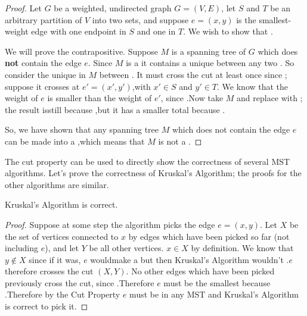 \documentclass{tufte-handout}
\begin{document}
\begin{proof}
  Let $G$ be a weighted, undirected graph $G = (V,E)$, let $S$ and $T$
  be an arbitrary partition of $V$ into two sets, and suppose
  $e = (x,y)$ is the smallest-weight edge with one endpoint in $S$ and
  one in $T$.  We wish to show that \blank.

  We will prove the contrapositive. Suppose $M$ is a spanning tree of
  $G$ which does \textbf{not} contain the edge $e$.  Since $M$ is a
  \blank it contains a unique \blank\linebreak between any two
  \blank. So consider the unique \blank\linebreak in $M$ between
  \blank.   It must cross the
  cut at least once since\linebreak \mbox{} \blank; suppose it crosses
  at $e' = (x',y')$,\linebreak with $x' \in S$ and $y' \in T$.  We
  know that the weight of $e$ is smaller than the weight of $e'$,
  since \blank.\linebreak Now take $M$ and replace \blank with \blank;
  the result is\linebreak still \blank because
  \blank,\linebreak but it has a smaller total \blank because \blank.

  So, we have shown that any spanning tree $M$ which does not contain
  the edge $e$ can be made into a \blank,\linebreak which means that
  $M$ is not a \blank.
\end{proof}

The cut property can be used to directly show the correctness of
several MST algorithms.  Let's prove the correctness of Kruskal's
Algorithm; the proofs for the other algorithms are similar.

\begin{thm}
  Kruskal's Algorithm is correct.
\end{thm}

\begin{proof}
  Suppose at some step the algorithm picks the edge $e = (x,y)$.  Let
  $X$ be the set of vertices connected to $x$ by edges which have been
  picked so far (not including $e$), and let $Y$ be all other
  vertices. $x \in X$ by definition.  We know that $y \notin X$ since
  if it was, $e$ would\linebreak make a \blank but then Kruskal's
  Algorithm wouldn't \blank.\linebreak $e$ therefore crosses the cut
  $(X,Y)$. No other edges which have been picked previously cross the
  cut, since \blank.\linebreak Therefore $e$ must be the smallest
  \blank\linebreak because \blank.\linebreak Therefore by the Cut
  Property $e$ must be in any MST and Kruskal's Algorithm is correct
  to pick it.
\end{proof}
\end{document}
